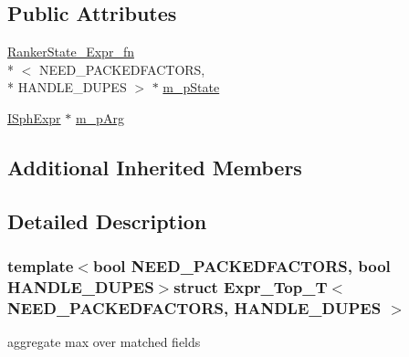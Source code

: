 \subsection*{Public Attributes}
\begin{DoxyCompactItemize}
\item 
\hyperlink{structRankerState__Expr__fn}{Ranker\-State\-\_\-\-Expr\-\_\-fn}\\*
$<$ N\-E\-E\-D\-\_\-\-P\-A\-C\-K\-E\-D\-F\-A\-C\-T\-O\-R\-S, \\*
H\-A\-N\-D\-L\-E\-\_\-\-D\-U\-P\-E\-S $>$ $\ast$ \hyperlink{structExpr__Top__T_acb9a236bae6b87fc812e0d7cf5fd6498}{m\-\_\-p\-State}
\item 
\hyperlink{structISphExpr}{I\-Sph\-Expr} $\ast$ \hyperlink{structExpr__Top__T_a306e53b0991fc3bc4255bf04d0916ac1}{m\-\_\-p\-Arg}
\end{DoxyCompactItemize}
\subsection*{Additional Inherited Members}


\subsection{Detailed Description}
\subsubsection*{template$<$bool N\-E\-E\-D\-\_\-\-P\-A\-C\-K\-E\-D\-F\-A\-C\-T\-O\-R\-S, bool H\-A\-N\-D\-L\-E\-\_\-\-D\-U\-P\-E\-S$>$struct Expr\-\_\-\-Top\-\_\-\-T$<$ N\-E\-E\-D\-\_\-\-P\-A\-C\-K\-E\-D\-F\-A\-C\-T\-O\-R\-S, H\-A\-N\-D\-L\-E\-\_\-\-D\-U\-P\-E\-S $>$}

aggregate max over matched fields 

